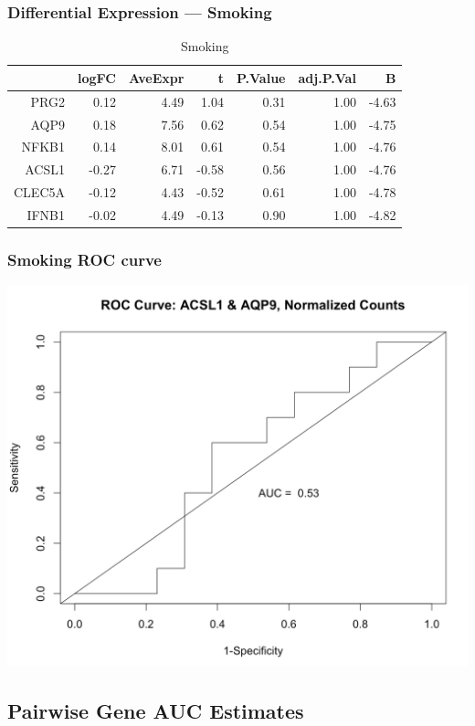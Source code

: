 \documentclass{beamer}
\begin{document}
\begin{frame}[fragile]
  	\frametitle{Differential Expression --- Smoking}
 		\begin{table}[ht]
		\caption {Smoking} \label{tab:smoking} 
		\centering
		\begin{tabular}{rrrrrrr}
 		 	\hline
 			& logFC & AveExpr & t & P.Value & adj.P.Val & B \\ 
 			 \hline
			PRG2 & 0.12 & 4.49 & 1.04 & 0.31 & 1.00 & -4.63 \\ 
  			AQP9 & 0.18 & 7.56 & 0.62 & 0.54 & 1.00 & -4.75 \\ 
  			NFKB1 & 0.14 & 8.01 & 0.61 & 0.54 & 1.00 & -4.76 \\ 
  			ACSL1 & -0.27 & 6.71 & -0.58 & 0.56 & 1.00 & -4.76 \\ 
  			CLEC5A & -0.12 & 4.43 & -0.52 & 0.61 & 1.00 & -4.78 \\ 
  			IFNB1 & -0.02 & 4.49 & -0.13 & 0.90 & 1.00 & -4.82 \\ 
  			\hline
		\end{tabular}
		\end{table}
\end{frame}

\begin{frame}
	 \frametitle{Smoking ROC curve}
		\centering
	 	\includegraphics[scale=0.4]{../paper/figs/smoking3.png}
\end{frame}


\subsection{Pairwise Gene AUC Estimates}
\end{document}
